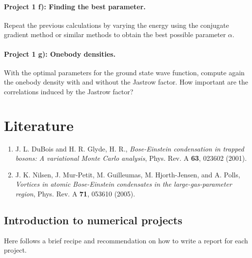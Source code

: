 \documentclass[%
oneside,                 %
final,                   %
10pt]{article}
\begin{document}
\paragraph{Project 1 f): Finding the best parameter.}
Repeat the previous calculations by varying the energy using the
conjugate gradient method or similar methods to obtain the best possible parameter
$\alpha$. 

\paragraph{Project 1 g): Onebody densities.}
With the optimal parameters for the ground state wave function, compute again the onebody density with and without the Jastrow
factor.  How important are the correlations induced by the Jastrow factor?




\section*{Literature}

\begin{enumerate}
 \item J. L. DuBois and H. R. Glyde, H. R., \emph{Bose-Einstein condensation in trapped bosons: A variational Monte Carlo analysis}, Phys. Rev. A \textbf{63}, 023602 (2001).

 \item J. K. Nilsen,  J. Mur-Petit, M. Guilleumas, M. Hjorth-Jensen, and A. Polls, \emph{Vortices in atomic Bose-Einstein condensates in the large-gas-parameter region}, Phys. Rev. A \textbf{71}, 053610 (2005).
\end{enumerate}

\noindent
\subsection*{Introduction to numerical projects}

Here follows a brief recipe and recommendation on how to write a report for each
project.
\end{document}
